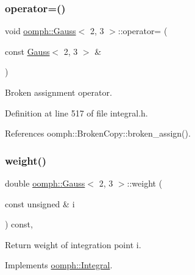 \mbox{\label{classoomph_1_1Gauss_3_012_00_013_01_4_ab4a5dd2f41b77c7373a6ebf0e79f692f}} 
\subsubsection{\texorpdfstring{operator=()}{operator=()}}
{\footnotesize\ttfamily void \hyperlink{classoomph_1_1Gauss}{oomph\+::\+Gauss}$<$ 2, 3 $>$\+::operator= (\begin{DoxyParamCaption}\item[{const \hyperlink{classoomph_1_1Gauss}{Gauss}$<$ 2, 3 $>$ \&}]{ }\end{DoxyParamCaption})\hspace{0.3cm}{\ttfamily [inline]}}



Broken assignment operator. 



Definition at line 517 of file integral.\+h.



References oomph\+::\+Broken\+Copy\+::broken\+\_\+assign().

\mbox{\label{classoomph_1_1Gauss_3_012_00_013_01_4_ac9118a628979e622859c23938674aafa}} 
\subsubsection{\texorpdfstring{weight()}{weight()}}
{\footnotesize\ttfamily double \hyperlink{classoomph_1_1Gauss}{oomph\+::\+Gauss}$<$ 2, 3 $>$\+::weight (\begin{DoxyParamCaption}\item[{const unsigned \&}]{i }\end{DoxyParamCaption}) const\hspace{0.3cm}{\ttfamily [inline]}, {\ttfamily [virtual]}}



Return weight of integration point i. 



Implements \hyperlink{classoomph_1_1Integral_ac65335e2aab120b285b3d6c294507b06}{oomph\+::\+Integral}.



